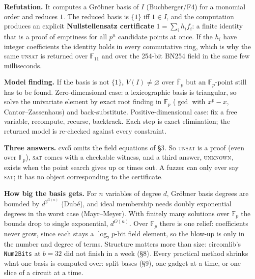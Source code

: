 \documentclass[10pt]{article}
\newcommand{\F}{\mathbb F}\newcommand{\wb}{\overline w}
\newcommand{\sect}[1]{\par\vspace{4pt}{\large\bfseries #1}\par\nobreak\vspace{1pt}}
\begin{document}
\sect{4. What cvc5 actually computes (no sampling anywhere)}
\textbf{Refutation.} It computes a Gr\"obner basis of $I$ (Buchberger/F4) for a monomial order and reduces $1$. The reduced basis is
$\{1\}$ iff $1\in I$, and the computation produces an explicit \textbf{Nullstellensatz certificate} $1=\sum_i h_i f_i$: a finite
identity that is a proof of emptiness for all $p^n$ candidate points at once. If the $h_i$ have integer coefficients the identity holds
in every commutative ring, which is why the same \textsc{unsat} is returned over $\F_{11}$ and over the 254-bit BN254 field in the same
few milliseconds.
\par\textbf{Model finding.} If the basis is not $\{1\}$, $V(I)\neq\varnothing$ over $\overline{\F}_p$ but an $\F_p$-point still has to be
found. Zero-dimensional case: a lexicographic basis is triangular, so solve the univariate element by exact root finding in $\F_p$
($\gcd$ with $x^p-x$, Cantor--Zassenhaus) and back-substitute. Positive-dimensional case: fix a free variable, recompute, recurse,
backtrack. Each step is exact elimination; the returned model is re-checked against every constraint.
\par\textbf{Three answers.} cvc5 omits the field equations of \S3. So \textsc{unsat} is a proof (even over $\overline{\F}_p$),
\textsc{sat} comes with a checkable witness, and a third answer, \textsc{unknown}, exists when the point search gives up or times out.
A fuzzer can only ever say \textsc{sat}; it has no object corresponding to the certificate.
\par\textbf{How big the basis gets.} For $n$ variables of degree $d$, Gr\"obner basis degrees are bounded by $d^{2^{O(n)}}$ (Dub\'e), and
ideal membership needs doubly exponential degrees in the worst case (Mayr--Meyer). With finitely many solutions over $\overline{\F}_p$
the bounds drop to single exponential, $d^{O(n)}$. Over $\F_p$ there is one relief: coefficients never grow, since each stays a
$\log_2p$-bit field element, so the blow-up is only in the number and degree of terms. Structure matters more than size: circomlib's
\texttt{Num2Bits} at $b=32$ did not finish in a week (\S8). Every practical method shrinks what one basis is computed over: split
bases (\S9), one gadget at a time, or one slice of a circuit at a time.
\end{document}
